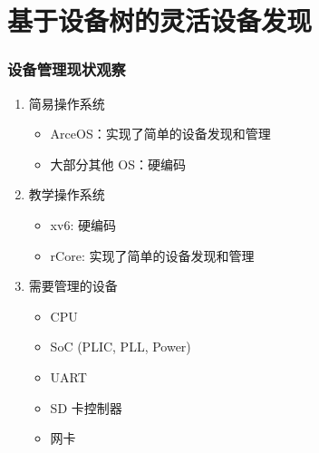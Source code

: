 \section{基于设备树的灵活设备发现}

\begin{frame}
    \frametitle{设备管理现状观察}

    \begin{enumerate}
        \item 简易操作系统
              \begin{itemize}
                  \item ArceOS：实现了简单的设备发现和管理
                  \item 大部分其他 OS：硬编码
              \end{itemize}
        \item 教学操作系统
              \begin{itemize}
                  \item xv6: 硬编码
                  \item rCore: 实现了简单的设备发现和管理
              \end{itemize}
        \item 需要管理的设备
              \begin{itemize}
                  \item CPU
                  \item SoC (PLIC, PLL, Power)
                  \item UART
                  \item SD 卡控制器
                  \item 网卡
              \end{itemize}

    \end{enumerate}

\end{frame}

